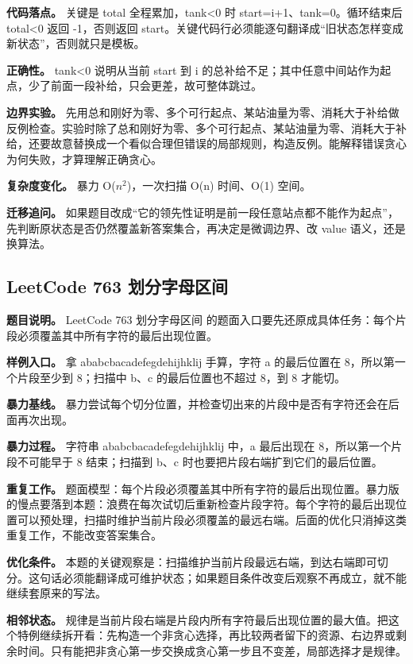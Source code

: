\textbf{代码落点。} 关键是 total 全程累加，tank<0 时 start=i+1、tank=0。循环结束后 total<0 返回 -1，否则返回 start。关键代码行必须能逐句翻译成“旧状态怎样变成新状态”，否则就只是模板。

\textbf{正确性。} tank<0 说明从当前 start 到 i 的总补给不足；其中任意中间站作为起点，少了前面一段补给，只会更差，故可整体跳过。

\textbf{边界实验。} 先用总和刚好为零、多个可行起点、某站油量为零、消耗大于补给做反例检查。实验时除了总和刚好为零、多个可行起点、某站油量为零、消耗大于补给，还要故意替换成一个看似合理但错误的局部规则，构造反例。能解释错误贪心为何失败，才算理解正确贪心。

\textbf{复杂度变化。} 暴力 O(\ensuremath{n^{2}})，一次扫描 O(n) 时间、O(1) 空间。

\textbf{迁移追问。} 如果题目改成“它的领先性证明是前一段任意站点都不能作为起点”，先判断原状态是否仍然覆盖新答案集合，再决定是微调边界、改 value 语义，还是换算法。

\subsection{LeetCode 763 划分字母区间}

\textbf{题目说明。} LeetCode 763 划分字母区间 的题面入口要先还原成具体任务：每个片段必须覆盖其中所有字符的最后出现位置。

\textbf{样例入口。} 拿 ababcbacadefegdehijhklij 手算，字符 a 的最后位置在 8，所以第一个片段至少到 8；扫描中 b、c 的最后位置也不超过 8，到 8 才能切。

\textbf{暴力基线。} 暴力尝试每个切分位置，并检查切出来的片段中是否有字符还会在后面再次出现。

\textbf{暴力过程。} 字符串 ababcbacadefegdehijhklij 中，a 最后出现在 8，所以第一个片段不可能早于 8 结束；扫描到 b、c 时也要把片段右端扩到它们的最后位置。

\textbf{重复工作。} 题面模型：每个片段必须覆盖其中所有字符的最后出现位置。暴力版的慢点要落到本题：浪费在每次试切后重新检查片段字符。每个字符的最后出现位置可以预处理，扫描时维护当前片段必须覆盖的最远右端。后面的优化只消掉这类重复工作，不能改变答案集合。

\textbf{优化条件。} 本题的关键观察是：扫描维护当前片段最远右端，到达右端即可切分。这句话必须能翻译成可维护状态；如果题目条件改变后观察不再成立，就不能继续套原来的写法。

\textbf{相邻状态。} 规律是当前片段右端是片段内所有字符最后出现位置的最大值。把这个特例继续拆开看：先构造一个非贪心选择，再比较两者留下的资源、右边界或剩余时间。只有能把非贪心第一步交换成贪心第一步且不变差，局部选择才是规律。

